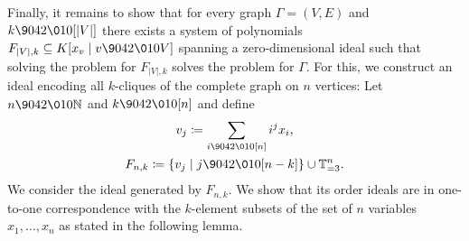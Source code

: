 \documentclass[11pt,oneside,english]{amsart}
\makeatletter
\numberwithin{equation}{section}
\numberwithin{figure}{section}
\theoremstyle{plain}
\theoremstyle{definition}
\theoremstyle{definition}
\theoremstyle{remark}
\theoremstyle{plain}
\theoremstyle{plain}
\theoremstyle{plain}
\theoremstyle{problem@}
\newcounter{problem}
\makeatother
\begin{document}
Finally, it remains to show that
for every graph $\Gamma = (V,E)$ and $k{\9042\010} [\lvert V
\rvert]$ there exists a
system of polynomials
$F_{\lvert V \rvert,k} \subseteq K[x_v \mid v {\9042\010} V]$
spanning a zero-dimensional ideal
such that solving the  problem for
$F_{\lvert V \rvert,k}$ solves the  problem for $\Gamma$.
For this, we construct an ideal encoding all $k$-cliques of the
complete graph on $n$ vertices: Let $n {\9042\010} {\mathbb{N}}$ and $k {\9042\010} [n]$ and define 
\begin{gather*}
  v_j \coloneqq \sum_{i {\9042\010} [n]} i^j x_i, \\
  F_{n,k} \coloneqq \{ v_j \mid j {\9042\010} [n-k] \} \cup {\mathbb{T}}^n_{=3}.
\end{gather*}
We consider the ideal generated by \(F_{n,k}\).
We show that its order ideals are in one-to-one correspondence with the
\(k\)-element subsets of the set of \(n\) variables \(x_1,\dots,x_n\)
as stated in the following
lemma.
\end{document}
